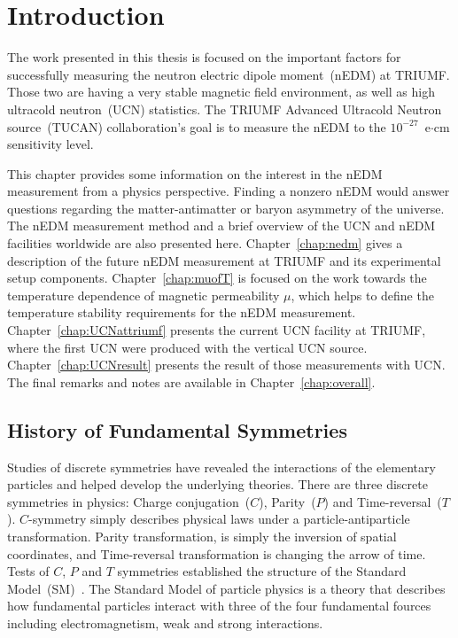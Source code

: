 \chapter{Introduction\label{chap:intro}}
\renewcommand{\thepage}{\arabic{page}}%
\setcounter{page}{1}%


The work presented in this thesis is focused on the important factors
for successfully measuring the neutron electric dipole moment~(nEDM)
at TRIUMF. Those two are having a very stable magnetic field
environment, as well as high ultracold neutron~(UCN) statistics. The
TRIUMF Advanced Ultracold Neutron source~(TUCAN) collaboration's goal
is to measure the nEDM to the $10^{-27}$~e$\cdot$cm sensitivity level.


This chapter provides some information on the interest in the nEDM
measurement from a physics perspective. Finding a nonzero nEDM would
answer questions regarding the matter-antimatter or baryon asymmetry
of the universe. The nEDM measurement method and a brief overview of
the UCN and nEDM facilities worldwide are also presented here.
Chapter~\ref{chap:nedm} gives a description of the future nEDM
measurement at TRIUMF and its experimental setup
components. Chapter~\ref{chap:muofT} is focused on the work towards
the temperature dependence of magnetic permeability $\mu$, which helps
to define the temperature stability requirements for the nEDM
measurement. Chapter~\ref{chap:UCNattriumf} presents the current UCN
facility at TRIUMF, where the first UCN were produced with the
vertical UCN source. Chapter~\ref{chap:UCNresult} presents the result
of those measurements with UCN. The final remarks and notes are
available in Chapter~\ref{chap:overall}.



\section{History of Fundamental Symmetries }

Studies of discrete symmetries have revealed the interactions of the
elementary particles and helped develop the underlying theories.
There are three discrete symmetries in physics: Charge
conjugation~($C$), Parity~($P$) and Time-reversal~($T$). $C$-symmetry
simply describes physical laws under a particle-antiparticle
transformation. Parity transformation, is simply the inversion of
spatial coordinates, and Time-reversal transformation is changing the
arrow of time.  Tests of $C$, $P$ and $T$ symmetries established the
structure of the Standard Model~(SM)~\cite{pospelov2005electric}. The
Standard Model of particle physics is a theory that describes how
fundamental particles interact with three of the four fundamental
fources including electromagnetism, weak and strong interactions.

